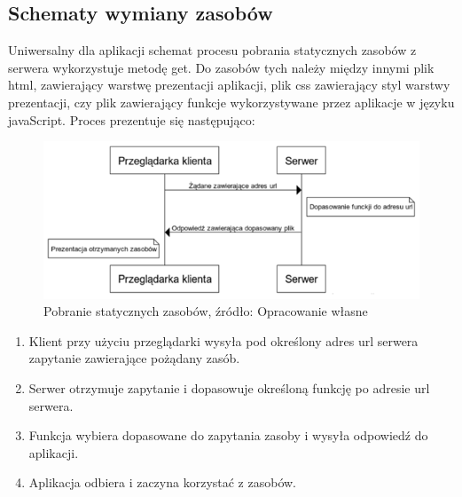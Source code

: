 \documentclass[12pt]{report}
\begin{document}
\subsection{Schematy wymiany zasobów}
Uniwersalny dla aplikacji schemat procesu pobrania statycznych zasobów z serwera wykorzystuje metodę get. Do zasobów tych należy między innymi plik html, zawierający warstwę prezentacji aplikacji, plik css zawierający styl warstwy prezentacji, czy plik zawierający funkcje wykorzystywane przez aplikacje w języku javaScript. Proces prezentuje się następująco:
\begin{figure}[!hb]
\centering
\includegraphics[width=\textwidth,height=\textheight,keepaspectratio]{K-S.png} 
\caption{Pobranie statycznych zasobów, źródło: Opracowanie własne}
\end{figure}
\begin{enumerate}
\item Klient przy użyciu przeglądarki wysyła pod określony adres url serwera zapytanie zawierające pożądany zasób.
\item Serwer otrzymuje zapytanie i dopasowuje określoną funkcję po adresie url serwera.
\item Funkcja wybiera dopasowane do zapytania zasoby i wysyła odpowiedź do aplikacji.
\item Aplikacja odbiera i zaczyna korzystać z zasobów.
\end{enumerate}
\end{document}
